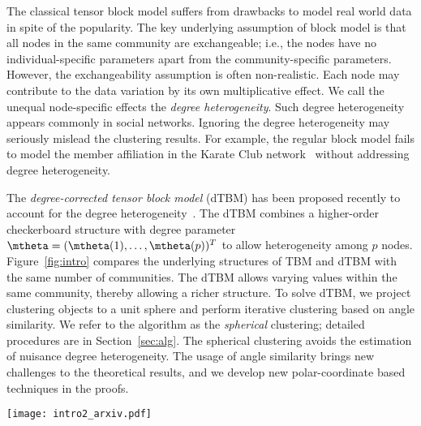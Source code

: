 \documentclass[lettersize,onecolumn,journal]{IEEEtran}
\theoremstyle{definition}
\theoremstyle{definition}
\begin{document}
The classical tensor block model suffers from drawbacks to model real world data in spite of the popularity. The key underlying assumption of block model is that all nodes in the same community are exchangeable; i.e., the nodes have no individual-specific parameters apart from the community-specific parameters. However, the exchangeability assumption is often non-realistic. Each node may contribute to the data variation by its own multiplicative effect. We call the unequal node-specific effects the \emph{degree heterogeneity}. Such degree heterogeneity appears commonly in social networks. Ignoring the degree heterogeneity may seriously mislead the clustering results. For example, the regular block model fails to model the member affiliation in the Karate Club network~\citep{bickel2009nonparametric} without addressing degree heterogeneity. 

The \emph{degree-corrected tensor block model} (dTBM) has been proposed recently to account for the degree heterogeneity~\citep{ke2019community}. The dTBM combines a higher-order checkerboard structure with degree parameter $\mtheta=(\mtheta(1),\ldots,\mtheta(p))^T$ to allow heterogeneity among $p$ nodes.  Figure~\ref{fig:intro} compares the underlying structures of TBM and dTBM with the same number of communities. The dTBM allows varying values within the same community, thereby allowing a richer structure. To solve dTBM, we project clustering objects to a unit sphere and perform iterative clustering based on angle similarity. We refer to the algorithm as the \textit{spherical} clustering; detailed procedures are in Section~\ref{sec:alg}. The spherical clustering avoids the estimation of nuisance degree heterogeneity. The usage of angle similarity brings new challenges to the theoretical results, and we develop new polar-coordinate based techniques in the proofs. 

\begin{figure*}[t]
    \centering
    \texttt{[image: intro2\_arxiv.pdf]}
    \caption{Examples for order-3 tensor block model (TBM) with and without degree correction. Both TBM and dTBM have four communities on each mode, while dTBM allows a richer structure with degree heterogeneity.
    }
    \label{fig:intro}
\end{figure*}
\end{document}
